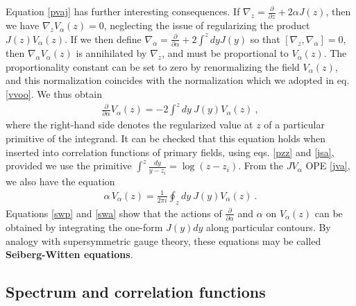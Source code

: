 \documentclass[12pt,a4paper,notitlepage]{report}
\numberwithin{equation}{section}
\theoremstyle{break}
\begin{document}
Equation \eqref{pvaj} has further interesting consequences.
If $\nabla_z={\frac{\partial}{\partial z}} +2\alpha J(z)$, then we have $\nabla_z V_\alpha(z)=0$, neglecting the issue of regularizing the product $J(z)V_\alpha(z)$.
If we then define $\nabla_\alpha = {\frac{\partial}{\partial \alpha}}+2\int^z dyJ(y)$ so that $[\nabla_z,\nabla_\alpha]=0$, then $\nabla_\alpha V_\alpha(z)$ is annihilated by $\nabla_z$, and must be proportional to $V_\alpha(z)$.
The proportionality constant can be set to zero by renormalizing the field $V_\alpha(z)$, and this normalization coincides with the normalization which we adopted in eq. \eqref{vvoo}.
We thus obtain
\begin{align}
 {\frac{\partial}{\partial \alpha}} V_\alpha(z) = -2 \int^z dy\ J(y)V_\alpha(z)\ ,
\label{swp}
\end{align}
where the right-hand side denotes the regularized value at $z$ of a particular primitive of the integrand.
It can be checked that this equation holds when inserted into correlation functions of primary fields, using eqs. \eqref{pzz} and \eqref{jsa}, provided we use the primitive $\int^z \frac{dy}{y-z_i} = \log(z-z_i)$.
From the $JV_\alpha$ OPE \eqref{jva}, we also have the equation
\begin{align}
 \alpha\, V_\alpha(z) = \frac{1}{2\pi i} \oint_{z} dy\ J(y)V_\alpha(z)\ .
\label{swa}
\end{align}
Equations \eqref{swp} and \eqref{swa} show that the actions of ${\frac{\partial}{\partial \alpha}}$ and $\alpha$ on $V_\alpha(z)$ can be obtained by integrating the one-form $J(y)dy$ along particular contours.
By analogy with supersymmetric gauge theory, these equations may be called \textbf{\boldmath Seiberg-Witten equations}. 


\subsection{Spectrum and correlation functions \label{secsacf}}
\end{document}
